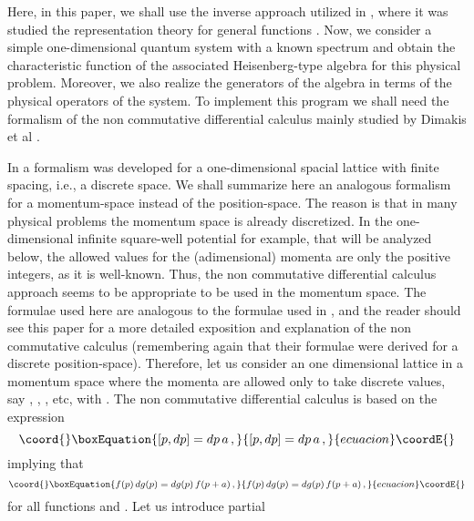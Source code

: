 \documentclass[a4paper,12pt]{article}
\begin{document}
Here, in this paper, we shall use the inverse approach 
utilized in \cite{algebra1,algebra2}, where it was 
studied the representation theory for general functions \coordHE{}. 
Now, we consider a simple one-dimensional quantum system
with a known spectrum and obtain the characteristic function
\coordHE{} of the associated Heisenberg-type algebra for
this physical problem. Moreover, we also realize the 
generators of the algebra in terms of the physical operators
of the system.
To implement this 
program we shall need the formalism of the non commutative 
differential calculus mainly studied by Dimakis et al 
\cite{dimakis1,dimakis2,dimakis3}. 

In  \cite{dimakis1} 
a formalism was developed for a one-dimensional 
spacial lattice with finite 
spacing, i.e., a discrete space. We shall summarize here an 
analogous  
formalism for a momentum-space instead of the 
position-space. The 
reason is that in many physical problems the momentum space is 
already discretized. In the 
one-dimensional infinite square-well potential for example, 
that will be analyzed below, 
the allowed values for the (adimensional) momenta are 
only the positive integers, as it is well-known. 
Thus, the non commutative differential calculus 
approach seems to be appropriate to be used in the momentum space.  
The formulae used here are analogous to the formulae used in 
\cite{dimakis1}, and the reader should see this paper for a 
more detailed exposition and explanation of the non commutative 
calculus (remembering again that their formulae 
were derived for a discrete position-space). Therefore, 
let us consider an  
one dimensional lattice in a momentum 
space where the 
momenta are allowed only to take discrete values, say \coordHE{}, 
\coordHE{}, \coordHE{}, \coordHE{} etc, with \coordHE{}.  
The 
non commutative differential calculus is based on the expression 
\begin{equation}\coord{}\boxEquation{
    [p,dp] = dp \, a
    \label{eq:noncom1} \, ,
}{
    [p,dp] = dp \, a
    \, ,
}{ecuacion}\coordE{}\end{equation}
implying that 
\begin{equation}\coord{}\boxEquation{
    f(p) \, dg(p) = dg(p) \, f(p+a) \, ,
    \label{eq:noncom2}
}{
    f(p) \, dg(p) = dg(p) \, f(p+a) \, ,
    }{ecuacion}\coordE{}\end{equation}
for all functions \coordHE{} and \coordHE{}. Let us introduce partial 
\end{document}
